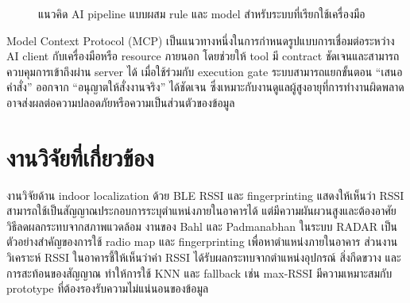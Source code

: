 \begin{figure}[htbp]
    \centering
    \caption{แนวคิด AI pipeline แบบผสม rule และ model สำหรับระบบที่เรียกใช้เครื่องมือ}
    \label{fig:ch2_neuro_symbolic_pipeline}
\end{figure}

Model Context Protocol (MCP) เป็นแนวทางหนึ่งในการกำหนดรูปแบบการเชื่อมต่อระหว่าง AI client กับเครื่องมือหรือ resource ภายนอก โดยช่วยให้ tool มี contract ชัดเจนและสามารถควบคุมการเข้าถึงผ่าน server ได้ \cite{ModelContextProtocol,Anthropic2024MCP} เมื่อใช้ร่วมกับ execution gate ระบบสามารถแยกขั้นตอน ``เสนอคำสั่ง'' ออกจาก ``อนุญาตให้สั่งงานจริง'' ได้ชัดเจน ซึ่งเหมาะกับงานดูแลผู้สูงอายุที่การทำงานผิดพลาดอาจส่งผลต่อความปลอดภัยหรือความเป็นส่วนตัวของข้อมูล

\section{งานวิจัยที่เกี่ยวข้อง}
\label{sec:ch2_related_work}

งานวิจัยด้าน indoor localization ด้วย BLE RSSI และ fingerprinting แสดงให้เห็นว่า RSSI สามารถใช้เป็นสัญญาณประกอบการระบุตำแหน่งภายในอาคารได้ แต่มีความผันผวนสูงและต้องอาศัยวิธีลดผลกระทบจากสภาพแวดล้อม งานของ Bahl และ Padmanabhan ในระบบ RADAR เป็นตัวอย่างสำคัญของการใช้ radio map และ fingerprinting เพื่อหาตำแหน่งภายในอาคาร \cite{Bahl2000RADAR} ส่วนงานวิเคราะห์ RSSI ในอาคารชี้ให้เห็นว่าค่า RSSI ได้รับผลกระทบจากตำแหน่งอุปกรณ์ สิ่งกีดขวาง และการสะท้อนของสัญญาณ \cite{Kaemarungsi2012RSSIAnalysis} ทำให้การใช้ KNN และ fallback เช่น max-RSSI มีความเหมาะสมกับ prototype ที่ต้องรองรับความไม่แน่นอนของข้อมูล


